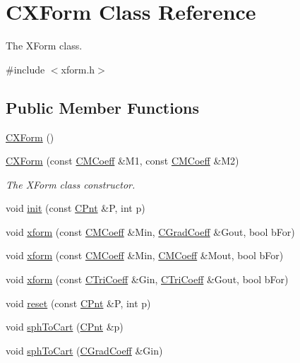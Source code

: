 \hypertarget{classCXForm}{\section{C\-X\-Form Class Reference}
\label{classCXForm}
}


The X\-Form class.  




{\ttfamily \#include $<$xform.\-h$>$}

\subsection*{Public Member Functions}
\begin{DoxyCompactItemize}
\item 
\hyperlink{classCXForm_a3079705401c30fcd28c9b6adc9fff542}{C\-X\-Form} ()
\item 
\hyperlink{classCXForm_ad2927e3f30011071f480639691c4a7fa}{C\-X\-Form} (const \hyperlink{classCMCoeff}{C\-M\-Coeff} \&M1, const \hyperlink{classCMCoeff}{C\-M\-Coeff} \&M2)
\begin{DoxyCompactList}\small\item\em The X\-Form class constructor. \end{DoxyCompactList}\item 
void \hyperlink{classCXForm_a9fe5afbc751e5d8a8d48aa20471c84a5}{init} (const \hyperlink{classCPnt}{C\-Pnt} \&P, int p)
\item 
void \hyperlink{classCXForm_aa86ee5b2fefaf70e9f914966555aa6ef}{xform} (const \hyperlink{classCMCoeff}{C\-M\-Coeff} \&Min, \hyperlink{classCGradCoeff}{C\-Grad\-Coeff} \&Gout, bool b\-For)
\item 
void \hyperlink{classCXForm_a1680a3a028017a27dea361e6af92f1fb}{xform} (const \hyperlink{classCMCoeff}{C\-M\-Coeff} \&Min, \hyperlink{classCMCoeff}{C\-M\-Coeff} \&Mout, bool b\-For)
\item 
void \hyperlink{classCXForm_a7c8028608cadb13dfa6320be661256d6}{xform} (const \hyperlink{classCTriCoeff}{C\-Tri\-Coeff} \&Gin, \hyperlink{classCTriCoeff}{C\-Tri\-Coeff} \&Gout, bool b\-For)
\item 
void \hyperlink{classCXForm_a4e9f8fd4d9fd24150cd357f724fa10c1}{reset} (const \hyperlink{classCPnt}{C\-Pnt} \&P, int p)
\item 
void \hyperlink{classCXForm_a092244b7fc2a15139d8aefac7600c549}{sph\-To\-Cart} (\hyperlink{classCPnt}{C\-Pnt} \&p)
\item 
void \hyperlink{classCXForm_abfae99a00642489f3431c8114112a608}{sph\-To\-Cart} (\hyperlink{classCGradCoeff}{C\-Grad\-Coeff} \&Gin)

\end{DoxyCompactItemize}
